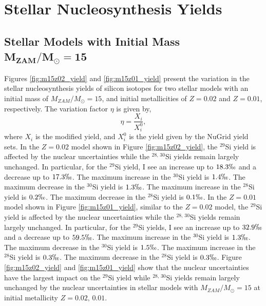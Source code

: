 \documentclass{brandeis-thesis3.2}
\def \msun {M_{\odot}}
\newcommand{\iso}[2]{$^{#1}${#2}}
\begin{document}
\section{Stellar Nucleosynthesis Yields} \label{yield_result}

\subsection[Stellar Models with Initial Mass $M_{ZAM}/\msun = 15$]{Stellar Models with Initial Mass $\mathbf{M_{ZAM}/\msun = 15}$}

Figures \ref{fig:m15z02_yield} and \ref{fig:m15z01_yield} present the variation in the stellar nucleosynthesis yields of silicon isotopes for two stellar models with an initial mass of $M_{ZAM}/\msun =15$, and initial metallicities of $Z=0.02$ and $Z=0.01$, respectively. The variation factor $\eta$ is given by,
\begin{equation}
    \eta = \frac{X_{i}}{X^{0}_i},
\end{equation}
where $X_i$ is the modified yield, and $X^0_i$ is the yield given by the NuGrid yield sets. In the $Z=0.02$ model shown in Figure \ref{fig:m15z02_yield}, the \iso{29}{Si} yield is affected by the nuclear uncertainties while the \iso{28, \, 30}{Si} yields remain largely unchanged. In particular, for the \iso{29}{Si} yield, I see an increase up to $18.3\permil$ and a decrease up to $17.3\permil$. The maximum increase in the \iso{30}{Si} yield is $1.4\permil$. The maximum decrease in the \iso{30}{Si} yield is $1.3\permil$. The maximum increase in the \iso{28}{Si} yield is $0.2\permil$. The maximum decrease in the \iso{28}{Si} yield is $0.1\permil$. In the $Z=0.01$ model shown in Figure \ref{fig:m15z01_yield}, similar to the $Z=0.02$ model, the \iso{29}{Si} yield is affected by the nuclear uncertainties while the \iso{28, \, 30}{Si} yields remain largely unchanged. In particular, for the \iso{29}{Si} yields, I see an increase up to $32.9\permil$ and a decrease up to $59.5\permil$. The maximum increase in the \iso{30}{Si} yield is $1.3\permil$. The maximum decrease in the \iso{30}{Si} yield is $1.5\permil$. The maximum increase in the \iso{28}{Si} yield is $0.3\permil$. The maximum decrease in the \iso{28}{Si} yield is $0.3\permil$. Figure \ref{fig:m15z02_yield} and \ref{fig:m15z01_yield} show that the nuclear uncertainties have the largest impact on the \iso{29}{Si} yield while \iso{28,\, 30}{Si} yields remain largely unchanged by the nuclear uncertainties in stellar models with $M_{ZAM}/\msun =15$ at initial metallicity $Z=0.02,\, 0.01$. 
\end{document}
